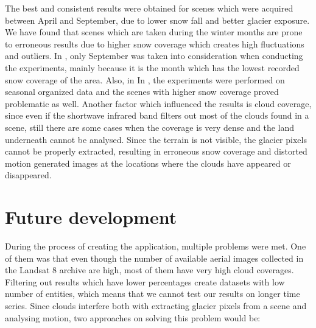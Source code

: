 \documentclass[12pt, a4paper]{report}
\begin{document}
	\par The best and consistent results were obtained for scenes which were acquired between April and September, due to lower snow fall and better glacier exposure. We have found that scenes which are taken during the winter months are prone to erroneous results due to higher snow coverage which creates high fluctuations and outliers. In \cite{TAK2020}, only September was taken into consideration when conducting the experiments, mainly because it is the month which has the lowest recorded snow coverage of the area. Also, in In \cite{RACOVITEANU2019}, the experiments were performed on seasonal organized data and the scenes with higher snow coverage proved problematic as well. Another factor which influenced the results is cloud coverage, since even if the shortwave infrared band filters out most of the clouds found in a scene, still there are some cases when the coverage is very dense and the land underneath cannot be analysed. Since the terrain is not visible, the glacier pixels cannot be properly extracted, resulting in erroneous snow coverage and distorted motion generated images at the locations where the clouds have appeared or disappeared.
	
	\section{Future development}
	\label{seq:future_development}
	
	\par During the process of creating the application, multiple problems were met. One of them was that even though the number of available aerial images collected in the Landsat 8 archive are high, most of them have very high cloud coverages. Filtering out results which have lower percentages create datasets with low number of entities, which means that we cannot test our results on longer time series. Since clouds interfere both with extracting glacier pixels from a scene and analysing motion, two approaches on solving this problem would be:
	
\end{document}
